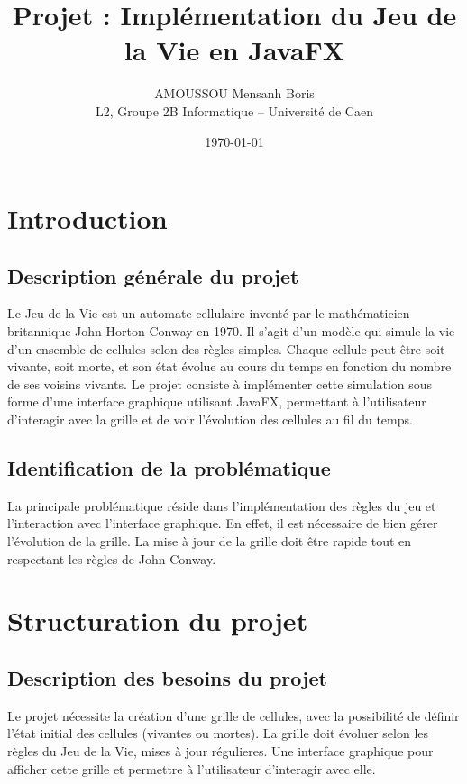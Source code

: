\documentclass[a4paper,12pt]{article}
\title{Projet : Implémentation du Jeu de la Vie en JavaFX}
\author{AMOUSSOU Mensanh Boris \\
L2, Groupe 2B Informatique – Université de Caen}
\date{\today}
\begin{document}
\maketitle
\tableofcontents
\newpage
    \section{Introduction}
    \subsection{Description générale du projet}
    Le Jeu de la Vie est un automate cellulaire inventé par le mathématicien britannique John Horton Conway en 1970. Il s'agit d'un modèle qui simule la vie d'un ensemble de cellules selon des règles simples. Chaque cellule peut être soit vivante, soit morte, et son état évolue au cours du temps en fonction du nombre de ses voisins vivants. Le projet consiste à implémenter cette simulation sous forme d'une interface graphique utilisant JavaFX, permettant à l'utilisateur d'interagir avec la grille et de voir l'évolution des cellules au fil du temps.
    \subsection{Identification de la problématique}
    La principale problématique réside dans l'implémentation des règles du jeu et l'interaction avec l'interface graphique. En effet, il est nécessaire de bien gérer l'évolution de la grille. La mise à jour de la grille doit être rapide tout en respectant les règles de John Conway. 
\section{Structuration du projet}
\subsection{Description des besoins du projet}
Le projet nécessite la création d'une grille de cellules, avec la possibilité de définir l'état initial des cellules (vivantes ou mortes). La grille doit évoluer selon les règles du Jeu de la Vie, mises à jour régulieres. Une interface graphique pour afficher cette grille et permettre à l'utilisateur d'interagir avec elle.
\end{document}
